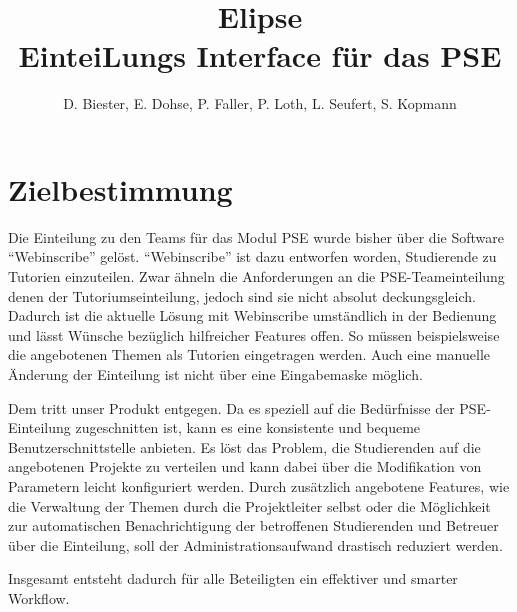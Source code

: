 \documentclass[parskip=full]{scrartcl}
\begin{document}
\title{Elipse\\
        \large  EinteiLungs Interface für das PSE}

\author{D. Biester, E. Dohse, P. Faller, P. Loth, L. Seufert, S. Kopmann}
        
\maketitle
 
\pagebreak
\tableofcontents
\pagebreak

\section{Zielbestimmung}

Die Einteilung zu den \glspl{Team} für das Modul \gls{PSE} wurde
bisher über die Software \enquote{Webinscribe} gelöst.
\enquote{Webinscribe} ist dazu entworfen worden, Studierende zu Tutorien einzuteilen.
Zwar ähneln die Anforderungen an die \gls{PSE}-Teameinteilung denen der Tutoriumseinteilung,
jedoch sind sie nicht absolut deckungsgleich. 
Dadurch ist die aktuelle Lösung mit Webinscribe umständlich in der Bedienung und lässt Wünsche bezüglich hilfreicher Features offen.
So müssen beispielsweise die angebotenen Themen als Tutorien eingetragen werden. 
Auch eine manuelle Änderung der Einteilung ist nicht über eine Eingabemaske
möglich.

Dem tritt unser Produkt entgegen.
Da es speziell auf die Bedürfnisse der \gls{PSE}-Einteilung zugeschnitten ist, 
kann es eine konsistente und bequeme Benutzerschnittstelle anbieten.
Es löst das Problem, die Studierenden auf die angebotenen Projekte zu verteilen
und kann dabei über die Modifikation von Parametern leicht konfiguriert werden.
Durch zusätzlich angebotene Features, wie die Verwaltung der Themen durch die Projektleiter selbst 
oder die Möglichkeit zur automatischen Benachrichtigung der betroffenen Studierenden und Betreuer über die
Einteilung, soll der Administrationsaufwand drastisch reduziert werden. 

Insgesamt entsteht dadurch für alle Beteiligten ein effektiver und smarter Workflow.
\end{document}
